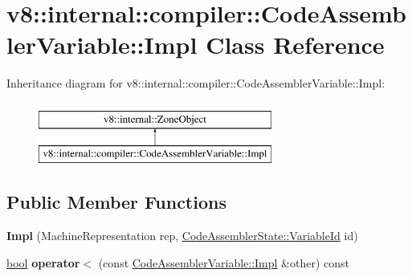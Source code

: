 \hypertarget{classv8_1_1internal_1_1compiler_1_1CodeAssemblerVariable_1_1Impl}{}\section{v8\+:\+:internal\+:\+:compiler\+:\+:Code\+Assembler\+Variable\+:\+:Impl Class Reference}
\label{classv8_1_1internal_1_1compiler_1_1CodeAssemblerVariable_1_1Impl}
Inheritance diagram for v8\+:\+:internal\+:\+:compiler\+:\+:Code\+Assembler\+Variable\+:\+:Impl\+:\begin{figure}[H]
\begin{center}
\leavevmode
\includegraphics[height=2.000000cm]{classv8_1_1internal_1_1compiler_1_1CodeAssemblerVariable_1_1Impl}
\end{center}
\end{figure}
\subsection*{Public Member Functions}
\begin{DoxyCompactItemize}
\item 
\mbox{\label{classv8_1_1internal_1_1compiler_1_1CodeAssemblerVariable_1_1Impl_aed19c6964fa03e8f4c4a553abc0fff70}} 
{\bfseries Impl} (Machine\+Representation rep, \mbox{\hyperlink{classuint32__t}{Code\+Assembler\+State\+::\+Variable\+Id}} id)
\item 
\mbox{\label{classv8_1_1internal_1_1compiler_1_1CodeAssemblerVariable_1_1Impl_a62396305291dfc291f4887330b3c16bc}} 
\mbox{\hyperlink{classbool}{bool}} {\bfseries operator$<$} (const \mbox{\hyperlink{classv8_1_1internal_1_1compiler_1_1CodeAssemblerVariable_1_1Impl}{Code\+Assembler\+Variable\+::\+Impl}} \&other) const
\end{DoxyCompactItemize}
